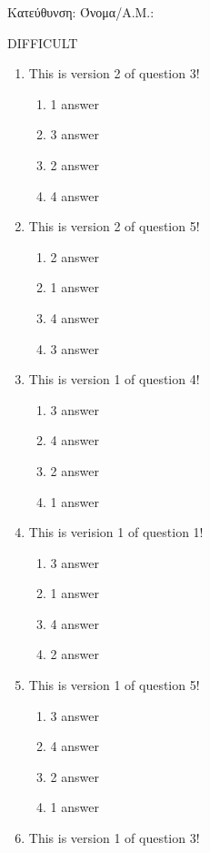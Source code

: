 \documentclass[a4paper, 11pt]{article}
\begin{document}
{\flushleft Κατεύθυνση: }
{\flushleft Όνομα/Α.Μ.: }
\vspace*{0.5cm}
\begin{center} {\Large  DIFFICULT } \end{center}
\begin{enumerate}
\item This is version 2 of question 3!
\begin{enumerate}[(1)]
    \item 1 answer
    \item 3 answer
    \item 2 answer
    \item 4 answer
\end{enumerate}
\item This is version 2 of question 5!
\begin{enumerate}[(1)]
    \item 2 answer
    \item 1 answer
    \item 4 answer
    \item 3 answer
\end{enumerate}
\item This is version 1 of question 4!
\begin{enumerate}[(1)]
    \item 3 answer
    \item 4 answer
    \item 2 answer
    \item 1 answer
\end{enumerate}
\item This is verision 1 of question 1!
\begin{enumerate}[(1)]
    \item 3 answer
    \item 1 answer
    \item 4 answer
    \item 2 answer
\end{enumerate}
\item This is version 1 of question 5!
\begin{enumerate}[(1)]
    \item 3 answer
    \item 4 answer
    \item 2 answer
    \item 1 answer
\end{enumerate}
\item This is version 1 of question 3!
\begin{enumerate}[(1)]

\end{enumerate}
\end{enumerate}
\end{document}
